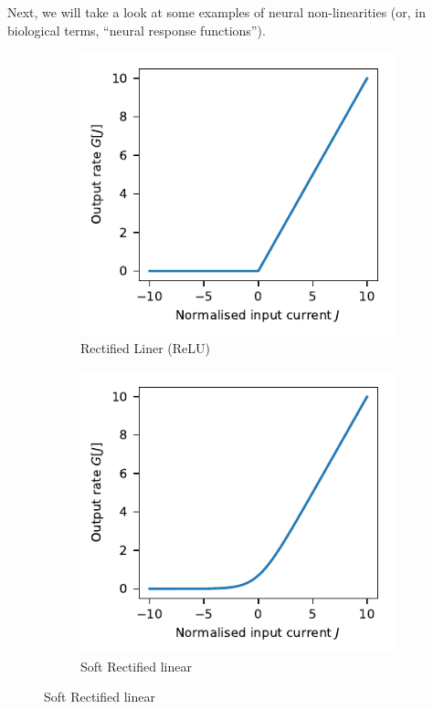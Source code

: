 \documentclass[10pt,letterpaper,oneside]{article}
\begin{document}
Next, we will take a look at some examples of neural non-linearities (or, in biological terms, \enquote{neural response functions}).

\begin{figure}
	\centering%
	\begin{subfigure}{0.5\textwidth}%
		\centering%
		\includegraphics{media/nonlinearity_relu.pdf}%
		\caption{Rectified Liner (ReLU)}%
		\label{fig:artificial_neurons_relu}
	\end{subfigure}%
	\begin{subfigure}{0.5\textwidth}%
		\centering%
		\includegraphics{media/nonlinearity_smooth_relu.pdf}%
		\caption{Soft Rectified linear}%
		\label{fig:artificial_neurons_smooth_relu}

\end{subfigure}
\end{figure}
\end{document}
